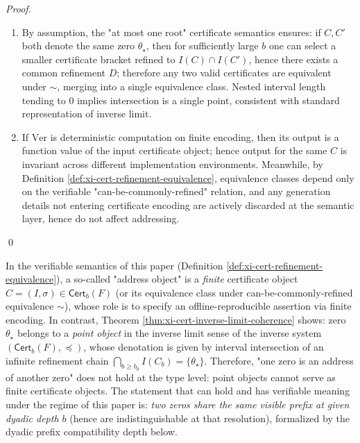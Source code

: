 \begin{proof}
\begin{enumerate}
  \item
  By assumption, the "at most one root" certificate semantics ensures: if \(C,C'\) both denote the same zero \(\theta_\star\), then for sufficiently large \(b\) one can select a smaller certificate bracket refined to \(I(C)\cap I(C')\), hence there exists a common refinement \(D\);
  therefore any two valid certificates are equivalent under \(\sim\), merging into a single equivalence class.
  Nested interval length tending to \(0\) implies intersection is a single point, consistent with standard representation of inverse limit.
  \item
  If \(\mathrm{Ver}\) is deterministic computation on finite encoding, then its output is a function value of the input certificate object;
  hence output for the same \(C\) is invariant across different implementation environments.
  Meanwhile, by Definition \ref{def:xi-cert-refinement-equivalence}, equivalence classes depend only on the verifiable "can-be-commonly-refined" relation,
  and any generation details not entering certificate encoding are actively discarded at the semantic layer, hence do not affect addressing.
\end{enumerate}
\qed
\end{proof}

\begin{corollary}\label{cor:xi-zero-not-address}
In the verifiable semantics of this paper (Definition \ref{def:xi-cert-refinement-equivalence}), a so-called "address object" is a \emph{finite} certificate object
\(
C=(I,\sigma)\in\mathsf{Cert}_b(F)
\)
(or its equivalence class under can-be-commonly-refined equivalence \(\sim\)), whose role is to specify an offline-reproducible assertion via finite encoding.
In contrast, Theorem \ref{thm:xi-cert-inverse-limit-coherence} shows: zero \(\theta_\star\) belongs to a \emph{point object} in the inverse limit sense of the inverse system \((\mathsf{Cert}_b(F),\preceq)\), whose denotation is given by interval intersection of an infinite refinement chain
\(
\bigcap_{b\ge b_0} I(C_b)=\{\theta_\star\}
\).
Therefore, "one zero is an address of another zero" does not hold at the type level: point objects cannot serve as finite certificate objects.
The statement that can hold and has verifiable meaning under the regime of this paper is: \emph{two zeros share the same visible prefix at given dyadic depth \(b\)} (hence are indistinguishable at that resolution), formalized by the dyadic prefix compatibility depth below.
\end{corollary}

